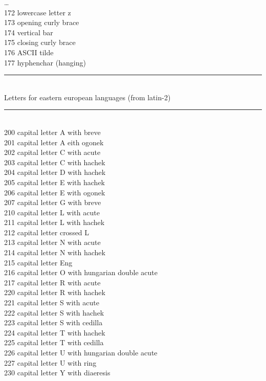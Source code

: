 \documentclass{article}
\renewcommand{\-}{\discretionary{\char'0177 }{}{}}
\begin{document}
\begin{tabbing}
\dots\>\\
172 \> lowercase letter z\\
173 \> opening curly brace\\
174 \> vertical bar\\
175 \> closing curly brace\\
176 \> ASCII tilde\\
177 \> hyphenchar (hanging)\\
\rule{\linewidth}{.4pt}\>\\
Letters for eastern european languages (from latin-2)\>\\
\rule{\linewidth}{.4pt}\>\\
200 \> capital letter A with breve\\
201 \> capital letter A eith ogonek\\
202 \> capital letter C with acute\\
203 \> capital letter C with hachek\\
204 \> capital letter D with hachek\\
205 \> capital letter E with hachek\\
206 \> capital letter E with ogonek\\
207 \> capital letter G with breve\\
210 \> capital letter L with acute\\
211 \> capital letter L with hachek\\
212 \> capital letter crossed L\\
213 \> capital letter N with acute\\
214 \> capital letter N with hachek\\
215 \> capital letter Eng\\
216 \> capital letter O with hungarian double acute\\
217 \> capital letter R with acute\\
220 \> capital letter R with hachek\\
221 \> capital letter S with acute\\
222 \> capital letter S with hachek\\
223 \> capital letter S with cedilla\\
224 \> capital letter T with hachek\\
225 \> capital letter T with cedilla\\
226 \> capital letter U with hungarian double acute\\
227 \> capital letter U with ring\\
230 \> capital letter Y with diaeresis\\

\end{tabbing}
\end{document}
